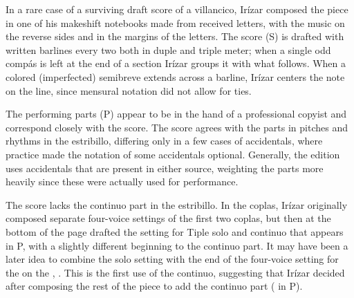 
\begin{notesources}

    \begin{source}
         
    \end{source}

    \begin{source}
    \end{source}

\end{notesources}

In a rare case of a surviving draft score of a villancico, Irízar composed the 
piece in one of his makeshift notebooks made from received letters, with the 
music on the reverse sides and in the margins of the letters.%
  \Autocites[285--338]{Cashner:PhD}
  {LopezCalo:Segovia}{Olarte:Irizar}
  {LopezCalo:IrizarLetters1}{Rodriguez:Networks}
The score (S) is drafted with written barlines every two  both 
in duple and triple meter; when a single odd compás is left at the end of a
section Irízar groups it with what follows.
When a colored (imperfected) semibreve extends across a barline, Irízar centers 
the note on the line, since mensural notation did not allow for ties.

The performing parts (P) appear to be in the hand of a professional copyist
and correspond closely with the score.
The score agrees with the parts in pitches and rhythms in the estribillo, 
differing only in a few cases of accidentals, where  
practice made the notation of some accidentals optional.
Generally, the edition uses accidentals that are present in either source,
weighting the parts more heavily since these were actually used for
performance.

The score lacks the  continuo part in the estribillo.
In the coplas, Irízar originally composed separate four-voice settings of the 
first two coplas, but then at the bottom of the page drafted the setting for 
Tiple solo and continuo that appears in P, with a slightly different beginning 
to the continuo part.
It may have been a later idea to combine the solo setting with the end of the 
four-voice setting for the  on the , .
This is the first use of the continuo, suggesting that Irízar decided after 
composing the rest of the piece to add the continuo part ( in P).

